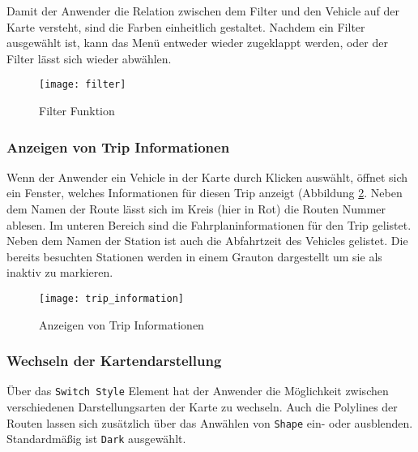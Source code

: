     Damit der Anwender die Relation zwischen dem Filter und den Vehicle auf der Karte versteht, sind die Farben einheitlich gestaltet. Nachdem ein Filter ausgewählt ist, kann das Menü entweder wieder zugeklappt werden, oder der Filter lässt sich wieder abwählen.

    \begin{figure}[htbp]
      \begin{center}
        \texttt{[image: filter]}
        \caption{Filter Funktion}
        \label{fig:filter}
      \end{center}
    \end{figure}
    

  \subsubsection*{Anzeigen von Trip Informationen}
  \label{ssub:anzeigen_von_trip_informationen}
    Wenn der Anwender ein Vehicle in der Karte durch Klicken auswählt, öffnet sich ein Fenster, welches Informationen für diesen Trip anzeigt (Abbildung \ref{fig:trip_information}. Neben dem Namen der Route lässt sich im Kreis (hier in Rot) die Routen Nummer ablesen. Im unteren Bereich sind die Fahrplaninformationen für den Trip gelistet. Neben dem Namen der Station ist auch die Abfahrtzeit des Vehicles gelistet. Die bereits besuchten Stationen werden in einem Grauton dargestellt um sie als inaktiv zu markieren.


    \begin{figure}[htbp]
      \begin{center}
        \texttt{[image: trip\_information]}
        \caption{Anzeigen von Trip Informationen}
        \label{fig:trip_information}
      \end{center}
    \end{figure}

    \pagebreak
    

  \subsubsection*{Wechseln der Kartendarstellung}
  \label{ssub:style_auswahl}
    Über das \texttt{Switch Style}  Element hat der Anwender die Möglichkeit zwischen verschiedenen Darstellungsarten der Karte zu wechseln. Auch die Polylines der Routen lassen sich zusätzlich über das Anwählen von \texttt{Shape} ein- oder ausblenden. Standardmäßig ist \texttt{Dark} ausgewählt.

